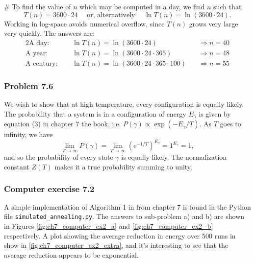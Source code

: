 \documentclass[12pt, a4paper]{article}
\begin{document}
{\begin{easylist}[enumerate]
# To find the value of $n$ which may be computed in a day, we find $n$ such that
\begin{equation*}
	T(n) = 3600 \cdot 24 \quad \text{   or, alternatively   } \quad \ln T(n) = \ln (3600 \cdot 24).
\end{equation*}
Working in log-space avoids numerical overflow, since $T(n)$ grows very large very quickly.
The answers are:
\begin{alignat*}{2}
	\text{A day: } &  \quad \ln T(n) = \ln (3600 \cdot 24) \quad&\Rightarrow n = 40 \\
	\text{A year: } &  \quad \ln T(n) = \ln (3600 \cdot 24 \cdot 365) \quad&\Rightarrow n = 48 \\
	\text{A century: } &  \quad \ln T(n) = \ln (3600 \cdot 24  \cdot 365 \cdot 100) \quad &\Rightarrow n = 55
\end{alignat*}

\end{easylist}


\subsubsection*{Problem 7.6}
We wish to show that at high temperature, every configuration is equally likely.
The probability that a system is in a configuration of energy $E_\gamma$ is given by equation (3) in chapter 7 the book, i.e. $P(\gamma) \propto \exp(-E_\gamma / T)$.
As $T$ goes to infinity, we have
\begin{equation*}
	\lim_{T \to \infty} P(\gamma) = 
	\lim_{T \to \infty} \left( e^{-1 / T} \right)^{E_\gamma} = 1^{E_\gamma} = 1,
\end{equation*}
and so the probability of every state $\gamma$ is equally likely. The normalization constant $Z(T)$ makes it a true probability summing to unity.




\subsubsection*{Computer exercise 7.2}
A simple implementation of Algorithm 1 in from chapter 7 is found in the Python file \verb|simulated_annealing.py|.
The answers to sub-problem a) and b) are shown in Figures \ref{fig:ch7_computer_ex2_a} and \ref{fig:ch7_computer_ex2_b} respectively.
A plot showing the average reduction in energy over 500 runs in show in \ref{fig:ch7_computer_ex2_extra}, and it's interesting to see that the average reduction appears to be exponential.


}
\end{document}
